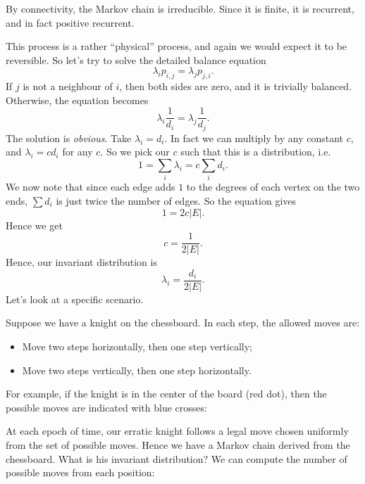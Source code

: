 \documentclass[a4paper]{article}
\begin{document}
\begin{eg}
  By connectivity, the Markov chain is irreducible. Since it is finite, it is recurrent, and in fact positive recurrent.

  This process is a rather ``physical'' process, and again we would expect it to be reversible. So let's try to solve the detailed balance equation
  \[
    \lambda_i p_{i, j} = \lambda_j p_{j, i}.
  \]
  If $j$ is not a neighbour of $i$, then both sides are zero, and it is trivially balanced. Otherwise, the equation becomes
  \[
    \lambda_i \frac{1}{d_i} = \lambda_j \frac{1}{d_j}.
  \]
  The solution is \emph{obvious}. Take $\lambda_i = d_i$. In fact we can multiply by any constant $c$, and $\lambda_i = c d_i$ for any $c$. So we pick our $c$ such that this is a distribution, i.e.
  \[
    1 = \sum_i \lambda_i = c \sum_i d_i.
  \]
  We now note that since each edge adds $1$ to the degrees of each vertex on the two ends, $\sum d_i$ is just twice the number of edges. So the equation gives
  \[
    1 = 2c |E|.
  \]
  Hence we get
  \[
    c = \frac{1}{2|E|}.
  \]
  Hence, our invariant distribution is
  \[
    \lambda_i = \frac{d_i}{2|E|}.
  \]
  Let's look at a specific scenario.

  Suppose we have a knight on the chessboard. In each step, the allowed moves are:
  \begin{itemize}
    \item Move two steps horizontally, then one step vertically;
    \item Move two steps vertically, then one step horizontally.
  \end{itemize}
  For example, if the knight is in the center of the board (red dot), then the possible moves are indicated with blue crosses:
  \begin{center}
  \end{center}
  At each epoch of time, our erratic knight follows a legal move chosen uniformly from the set of possible moves. Hence we have a Markov chain derived from the chessboard. What is his invariant distribution? We can compute the number of possible moves from each position:
  \begin{center}
\end{center}
\end{eg}
\end{document}

